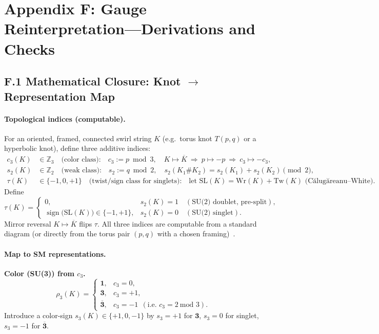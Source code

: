 \documentclass[11pt]{article}
\begin{document}
\section*{Appendix F: Gauge Reinterpretation—Derivations and Checks}
\label{app:gauge_reinterpretation}

\subsection*{F.1 Mathematical Closure: Knot $\to$ Representation Map}

\paragraph{Topological indices (computable).}
For an oriented, framed, connected swirl string $K$ (e.g.\ torus knot $T(p,q)$ or a hyperbolic knot), define three additive indices:
\begin{align*}
	c_3(K) &\in \mathbb{Z}_3
	\quad\text{(color class):}\quad
	c_3 := p \bmod 3,
	\quad
	K \mapsto \overline{K}\ \Rightarrow\ p\mapsto -p\ \Rightarrow\ c_3 \mapsto -c_3, \\
	s_2(K) &\in \mathbb{Z}_2
	\quad\text{(weak class):}\quad
	s_2 := q \bmod 2,
	\quad
	s_2(K_1\#K_2)= s_2(K_1)+s_2(K_2)\!\!\!\pmod{2}, \\
	\tau(K) &\in \{-1,0,+1\}
	\quad\text{(twist/sign class for singlets):}\quad
	\text{let } \mathrm{SL}(K)=\mathrm{Wr}(K)+\mathrm{Tw}(K) \text{ (Călugăreanu--White).}
\end{align*}
Define
\[
	\tau(K)=
	\begin{cases}
		0, & s_2(K)=1\quad(\text{SU(2) doublet, pre-split}),\\[3pt]
		\operatorname{sign}\!\big(\mathrm{SL}(K)\big)\in\{-1,+1\}, & s_2(K)=0\quad(\text{SU(2) singlet}).
	\end{cases}
\]
Mirror reversal $K\mapsto\overline{K}$ flips $\tau$.
All three indices are computable from a standard diagram (or directly from the torus pair $(p,q)$ with a chosen framing)~\cite{Calugareanu1961,White1969}.

\paragraph{Map to SM representations.}
\textbf{Color (SU(3)) from $c_3$.}
\[
	\rho_3(K)=
	\begin{cases}
		\mathbf{1}, & c_3=0,\\
		\mathbf{3}, & c_3=+1,\\
		\overline{\mathbf{3}}, & c_3=-1\ \ (\text{i.e.\ }c_3=2\ \text{mod }3).
	\end{cases}
\]
Introduce a color-sign $s_3(K)\in\{+1,0,-1\}$ by $s_3=+1$ for $\mathbf 3$, $s_3=0$ for singlet, $s_3=-1$ for $\overline{\mathbf 3}$.
\smallskip
\end{document}
